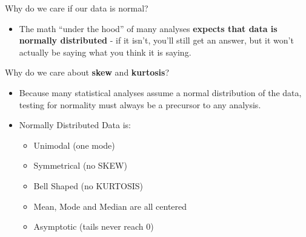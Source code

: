\documentclass[
  ignorenonframetext,
]{beamer}
\providecommand{\tightlist}{%
  \setlength{\itemsep}{0pt}\setlength{\parskip}{0pt}}
\begin{document}
\begin{frame}{Why do we care if our data is normal?}
\label{why-do-we-care-if-our-data-is-normal}
\begin{itemize}
\tightlist
\item
  The math ``under the hood'' of many analyses \textbf{expects that data
  is normally distributed} - if it isn't, you'll still get an answer,
  but it won't actually be saying what you think it is saying.
\end{itemize}
\end{frame}

\begin{frame}{Why do we care about \textbf{skew} and \textbf{kurtosis}?}
\label{why-do-we-care-about-skew-and-kurtosis}
\begin{itemize}
\tightlist
\item
  Because many statistical analyses assume a normal distribution of the
  data, testing for normality must always be a precursor to any
  analysis.
\end{itemize}

\begin{itemize}
\tightlist
\item
  Normally Distributed Data is:

  \begin{itemize}
  \tightlist
  \item
    Unimodal (one mode)
  \item
    Symmetrical (no SKEW)
  \item
    Bell Shaped (no KURTOSIS)
  \item
    Mean, Mode and Median are all centered
  \item
    Asymptotic (tails never reach 0)
  \end{itemize}
\end{itemize}
\end{frame}
\end{document}
